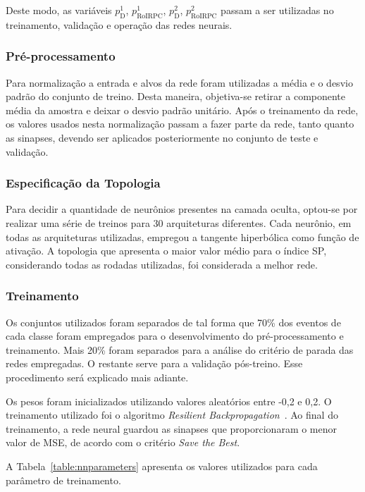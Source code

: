 Deste modo, as variáveis $p^1_\text{D}$, $p^1_\text{RoIRPC}$, $p^2_\text{D}$,
$p^2_\text{RoIRPC}$ passam a ser utilizadas no treinamento, validação e operação
das redes neurais.

\subsubsection{Pré-processamento}

Para normalização a entrada e alvos da rede foram utilizadas a média e o desvio
padrão do conjunto de treino. Desta maneira, objetiva-se retirar a componente
média da amostra e deixar o desvio padrão unitário. Após o treinamento da rede,
os valores usados nesta normalização passam a fazer parte da rede, tanto quanto
as sinapses, devendo ser aplicados posteriormente no conjunto de teste e
validação.


\subsubsection{Especificação da Topologia}

Para decidir a quantidade de neurônios presentes na camada oculta, optou-se por
realizar uma série de treinos para 30 arquiteturas diferentes. Cada neurônio,
em todas as arquiteturas utilizadas, empregou a tangente hiperbólica como
função de ativação. A topologia que apresenta o maior valor médio para o índice
SP, considerando todas as rodadas utilizadas, foi considerada a melhor rede.

\subsubsection{Treinamento}

Os conjuntos utilizados foram separados de tal forma que 70\% dos eventos de
cada classe foram empregados para o desenvolvimento do pré-processamento e
treinamento. Mais 20\% foram separados para a análise do critério de
parada das redes empregadas. O restante serve para a validação pós-treino. Esse
procedimento será explicado mais adiante.

Os pesos foram inicializados utilizando valores aleatórios entre -0,2 e 0,2. O
treinamento utilizado foi o algoritmo \emph{Resilient
Backpropagation}~\cite{RIEDMILLER1993}. Ao final do treinamento, a rede neural
guardou as sinapses que proporcionaram o menor valor de MSE, de acordo com o
critério \emph{Save the Best}.

A Tabela~\ref{table:nnparameters} apresenta os valores utilizados para cada
parâmetro de treinamento.


